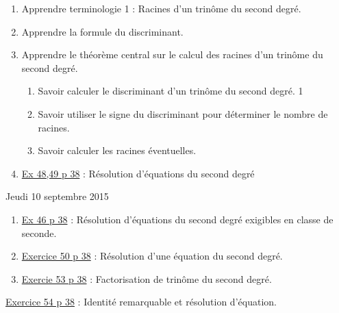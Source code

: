 \documentclass[a4paper,11pt]{article}
\theoremstyle{break}
\begin{document}
  \begin{Dev}
    
    \begin{enumerate}
      
      \item Apprendre terminologie 1 : Racines d'un trinôme du second degré.
      \item Apprendre la formule du discriminant.
      \item Apprendre le théorème central sur le calcul des racines 
      d'un trinôme du second degré.
      \begin{enumerate}
	\item Savoir calculer le discriminant d'un trinôme du second degré. 1
	\item Savoir utiliser le signe du discriminant pour déterminer
	le nombre de racines.
	\item Savoir calculer les racines éventuelles.
      \end{enumerate}
      \item  
      \href{https://github.com/mathlorgues/math1sd1516/blob/master/images/47-52p38.png}
      {Ex 48,49 p 38} : 
      Résolution d'équations du second degré
      
      
    \end{enumerate}
  \end{Dev}
  \newpage
  
  Jeudi 10 septembre 2015
  \begin{enumerate}   
    \item  
    \href{https://github.com/mathlorgues/math1sd1516/blob/master/images/46p38.jpg}
    {Ex 46 p 38} : Résolution d'équations du second degré exigibles en classe de seconde.
    
    \item 
    \href{https://github.com/mathlorgues/math1sd1516/blob/master/20150907/46p38.jpg}
    {Exercice 50 p 38} : Résolution d'une équation du second degré.
    \item 
    \href{https://github.com/mathlorgues/math1sd1516/blob/master/images/53-54p38.png}
    {Exercie 53 p 38} : Factorisation de trinôme du second degré.
    
  \end{enumerate}
  
  \begin{Dev}  
    \href{https://github.com/mathlorgues/math1sd1516/blob/master/images/53-54p38.png}
    {Exercice 54 p 38} : Identité remarquable et résolution d'équation.
  \end{Dev}
  
\end{document}
